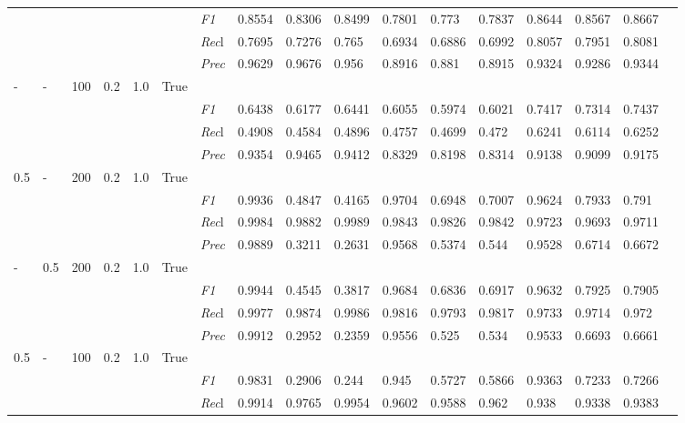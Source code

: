 \begin{table}[]
\begin{tabularx}{\textwidth}{XXXXXX|X|XXX|XXX|XXXX}
& & & & & & \textit{F1} & 0.8554 & 0.8306 & 0.8499 & 0.7801 & 0.773        & 0.7837        & 0.8644        & 0.8567        & 0.8667        \\
& & & & & & \textit{Rec}l & 0.7695 & 0.7276 & 0.765    & 0.6934 & 0.6886    & 0.6992    & 0.8057    & 0.7951    & 0.8081    \\
& & & & & & \textit{Prec} & 0.9629 & 0.9676 & 0.956 & 0.8916 & 0.881 & 0.8915 & 0.9324 & 0.9286 & 0.9344 \\ \midrule
- & - & 100 & 0.2 & 1.0 &True & & & & & & & & & \\
& & & & & & \textit{F1} & 0.6438 & 0.6177 & 0.6441 & 0.6055 & 0.5974        & 0.6021        & 0.7417        & 0.7314        & 0.7437        \\
& & & & & & \textit{Rec}l & 0.4908 & 0.4584 & 0.4896    & 0.4757 & 0.4699    & 0.472    & 0.6241    & 0.6114    & 0.6252    \\
& & & & & & \textit{Prec} & 0.9354 & 0.9465 & 0.9412 & 0.8329 & 0.8198 & 0.8314 & 0.9138 & 0.9099 & 0.9175 \\ \midrule
0.5 & - & 200 & 0.2 & 1.0 &True & & & & & & & & & \\
& & & & & & \textit{F1} & 0.9936 & 0.4847 & 0.4165 & 0.9704 & 0.6948        & 0.7007        & 0.9624        & 0.7933        & 0.791        \\
& & & & & & \textit{Rec}l & 0.9984 & 0.9882 & 0.9989    & 0.9843 & 0.9826    & 0.9842    & 0.9723    & 0.9693    & 0.9711    \\
& & & & & & \textit{Prec} & 0.9889 & 0.3211 & 0.2631 & 0.9568 & 0.5374 & 0.544 & 0.9528 & 0.6714 & 0.6672 \\ \midrule
- & 0.5 & 200 & 0.2 & 1.0 &True & & & & & & & & & \\
& & & & & & \textit{F1} & 0.9944 & 0.4545 & 0.3817 & 0.9684 & 0.6836        & 0.6917        & 0.9632        & 0.7925        & 0.7905        \\
& & & & & & \textit{Rec}l & 0.9977 & 0.9874 & 0.9986    & 0.9816 & 0.9793    & 0.9817    & 0.9733    & 0.9714    & 0.972    \\
& & & & & & \textit{Prec} & 0.9912 & 0.2952 & 0.2359 & 0.9556 & 0.525 & 0.534 & 0.9533 & 0.6693 & 0.6661 \\ \midrule
0.5 & - & 100 & 0.2 & 1.0 &True & & & & & & & & & \\
& & & & & & \textit{F1} & 0.9831 & 0.2906 & 0.244 & 0.945 & 0.5727        & 0.5866        & 0.9363        & 0.7233        & 0.7266        \\
& & & & & & \textit{Rec}l & 0.9914 & 0.9765 & 0.9954    & 0.9602 & 0.9588    & 0.962    & 0.938    & 0.9338    & 0.9383    \\

\end{tabularx}
\end{table}
